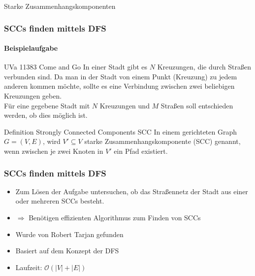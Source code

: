 \begin{frame}
	\Huge Starke Zusammenhangskomponenten
\end{frame}

\begin{frame}
	\frametitle{SCCs finden mittels DFS}
	\framesubtitle{Beispielaufgabe}
	\begin{KITexampleblock}{UVa 11383 Come and Go}
		In einer Stadt gibt es $N$  Kreuzungen, die durch Straßen verbunden sind.
		Da man in der Stadt von einem Punkt (Kreuzung) zu jedem anderen kommen möchte, sollte es eine Verbindung zwischen zwei beliebigen Kreuzungen geben. \\
		Für eine gegebene Stadt mit $N$ Kreuzungen und $M$ Straßen soll entschieden werden, ob dies möglich ist.
			
	\end{KITexampleblock}
	\pause 
	\bigskip
	
	\begin{KITinfoblock}{Definition Strongly Connected Components SCC}
		In einem gerichteten Graph $G = (V,E)$, wird $V' \subseteq V$ starke Zusammenhangskomponente (SCC) genannt, wenn zwischen je zwei Knoten in $V'$ ein Pfad existiert.
	\end{KITinfoblock}
	
	
\end{frame}

\begin{frame}
	\frametitle{SCCs finden mittels DFS}
	\begin{itemize}
		\item Zum Lösen der Aufgabe untersuchen, ob das Straßennetz der Stadt aus einer oder mehreren SCCs besteht.
		\item $\Rightarrow$ Benötigen effizienten Algorithmus zum Finden von SCCs 
	\end{itemize}	
	\pause
	\begin{itemize}
		\item Wurde von Robert Tarjan gefunden
		\item Basiert auf dem Konzept der DFS
		\item Laufzeit: $\mathcal{O}(|V| + |E|)$
	\end{itemize}
\end{frame}

